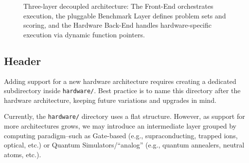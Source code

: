 \begin{figure}[htbp]
{%
}
\caption{Three-layer decoupled architecture: The Front-End orchestrates execution, the pluggable Benchmark Layer defines problem sets and scoring, and the Hardware Back-End handles hardware-specific execution via dynamic function pointers.}
\label{fig:arch_3layers_decoupled}
\end{figure}

\subsection{Header}

Adding support for a new hardware architecture requires creating a dedicated subdirectory inside \texttt{hardware/}. Best practice is to name this directory after the hardware architecture, keeping future variations and upgrades in mind.

Currently, the \texttt{hardware/} directory uses a flat structure. However, as support for more architectures grows, we may introduce an intermediate layer grouped by computing paradigm--such as Gate-based (e.g., supraconducting, trapped ions, optical, etc.) or Quantum Simulators/``analog'' (e.g., quantum annealers, neutral atoms, etc.).

